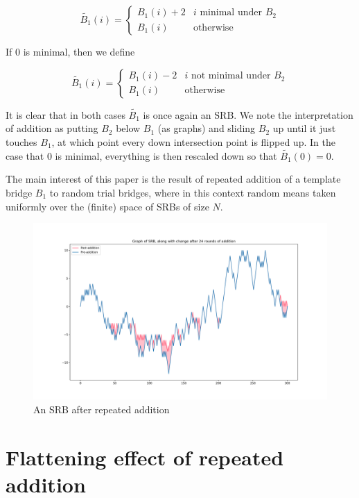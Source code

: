 \documentclass{article}
\theoremstyle{definition}
\begin{document}
\begin{equation*}
\tilde{B_1}(i)=\begin{cases} B_1(i)+2 & i \,\,\mathrm{minimal\,\, under\,\,}B_2 \\
B_1(i)& \mathrm{otherwise}
\end{cases}
\end{equation*}

If $0$ is minimal, then we define

\begin{equation*}
\tilde{B_1}(i)=\begin{cases} B_1(i)-2 & i \,\,\mathrm{not\,\,minimal\,\,under\,\,}B_2 \\
B_1(i)& \mathrm{otherwise}
\end{cases}
\end{equation*}

It is clear that in both cases $\tilde{B_1}$ is once again an SRB. We note the interpretation of addition as putting $B_2$ below $B_1$ (as graphs) and sliding $B_2$ up until it just touches $B_1$, at which point every down intersection point is flipped up. In the case that $0$ is minimal, everything is then rescaled down so that $\tilde{B_1}(0)=0$.

The main interest of this paper is the result of repeated addition of a template bridge $B_1$ to random trial bridges, where in this context random means taken uniformly over the (finite) space of SRBs of size $N$.

\begin{figure}[h!]
\caption{An SRB after repeated addition}
\centering
\includegraphics[width=\textwidth]{Figure_2}
\end{figure}

\section{Flattening effect of repeated addition}
\end{document}
